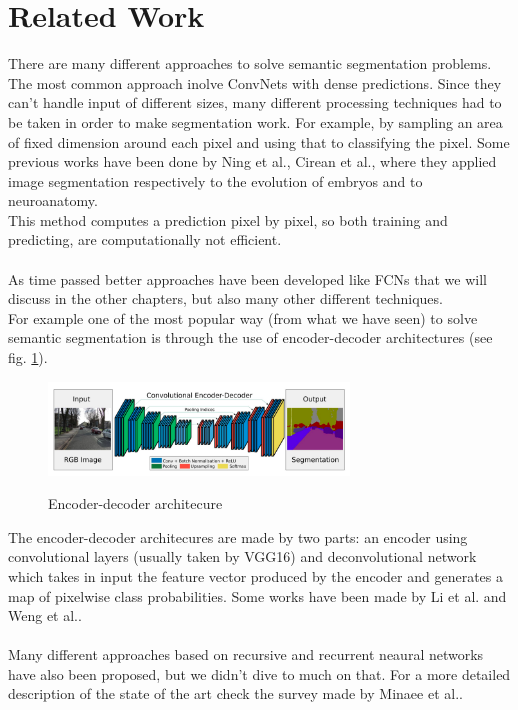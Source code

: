 \documentclass[10pt,twocolumn,letterpaper]{article}
\begin{document}
\section{Related Work}

There are many different approaches to solve semantic segmentation problems. The most common approach inolve ConvNets with dense predictions. Since they can't handle input of different sizes, many different processing techniques had to be taken in order to make segmentation work. For example, by sampling an area of fixed dimension around each pixel and  using that to classifying the pixel. Some previous works have been done by Ning et al.\cite{1495508}, Cirean et al.\cite{article}, where they applied image segmentation respectively to the evolution of embryos and to neuroanatomy. \\
This method computes a prediction pixel by pixel, so both training and predicting, are computationally not efficient. \\ \\
As time passed better approaches have been developed like FCNs that we will discuss in the other chapters, but also many other different techniques.\\
For example one of the most popular way (from what we have seen) to solve semantic segmentation is through the use of encoder-decoder architectures (see fig. \ref{ednet}).
\begin{figure}[t]
	\includegraphics[width=8cm]{image/ednet}
	\label{ednet}
	\centering
	\caption{Encoder-decoder architecure}
\end{figure}
The encoder-decoder architecures are made by two parts: an encoder using convolutional layers (usually taken by VGG16) and deconvolutional network which takes in input the feature vector produced by the encoder and generates a map of pixelwise class probabilities. Some works have been made by Li et al.\cite{8379359} and Weng et al.\cite{8681706}.\\ \\
Many different approaches based on recursive and recurrent neaural networks have also been proposed, but we didn't dive to much on that. For a more detailed description of the state of the art check the survey made by Minaee et al.\cite{unknown}. 
\end{document}
